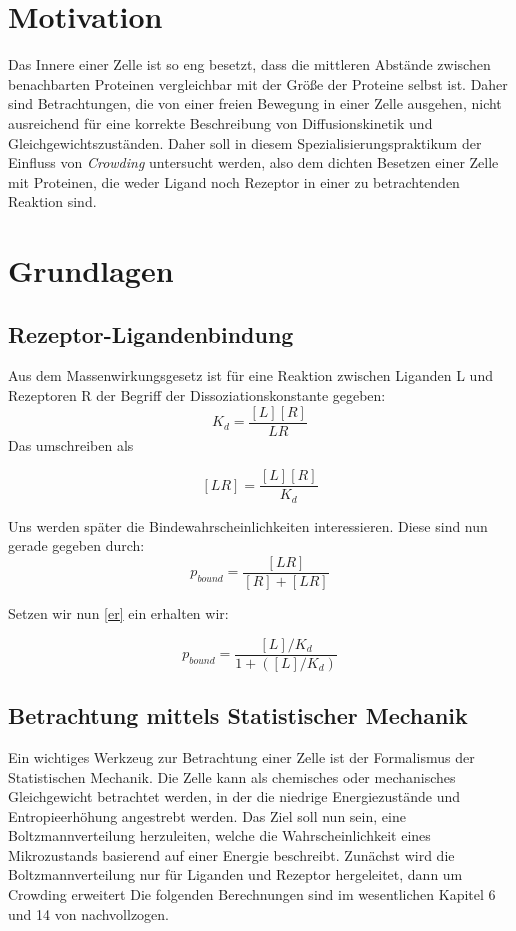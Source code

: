 \documentclass[bachelor,       %
               twoside,        %
               BCOR10mm,       %
               english,ngerman, %
               ]{GAUBM}
\begin{document}
\mainmatter   %

\chapter{Motivation}
Das Innere einer Zelle ist so eng besetzt, dass die mittleren Abstände zwischen
benachbarten Proteinen vergleichbar mit der Größe der Proteine selbst ist.
Daher sind Betrachtungen, die von einer freien Bewegung in einer Zelle ausgehen,
nicht ausreichend für eine korrekte Beschreibung von Diffusionskinetik und Gleichgewichtszuständen.
Daher soll in diesem Spezialisierungspraktikum der Einfluss von \emph{Crowding}
untersucht werden, also dem dichten Besetzen einer Zelle mit Proteinen, die weder
Ligand noch Rezeptor in einer zu betrachtenden Reaktion sind.


\chapter{Grundlagen}
\section{Rezeptor-Ligandenbindung}

Aus dem Massenwirkungsgesetz ist für eine Reaktion zwischen Liganden L und Rezeptoren R der Begriff
der Dissoziationskonstante gegeben:
\begin{equation}
K_d = \frac{[L][R]}{LR}
\end{equation}
Das umschreiben als

\begin{equation}
\label{er}
[LR] = \frac{[L][R]}{K_d}
\end{equation}

Uns werden später die Bindewahrscheinlichkeiten interessieren. Diese sind nun gerade gegeben durch:
\begin{equation}
p_{bound} = \frac{[LR]}{[R]+[LR]}
\end{equation}

Setzen wir nun \ref{er} ein erhalten wir:

\begin{equation}
\label{pbounddiss}
p_{bound} = \frac{[L]/K_d}{1+([L]/K_d)}
\end{equation}



\section{Betrachtung mittels Statistischer Mechanik}
Ein wichtiges Werkzeug zur Betrachtung einer Zelle ist der Formalismus der
Statistischen Mechanik. Die Zelle kann als chemisches oder mechanisches Gleichgewicht
betrachtet werden, in der die niedrige Energiezustände und Entropieerhöhung angestrebt
werden. Das Ziel soll nun sein, eine Boltzmannverteilung herzuleiten, welche die
Wahrscheinlichkeit eines Mikrozustands basierend auf einer Energie beschreibt.
Zunächst wird die Boltzmannverteilung nur für Liganden und Rezeptor hergeleitet,
dann um Crowding erweitert
Die folgenden Berechnungen sind im wesentlichen Kapitel 6 und 14 von
\cite{phybio} nachvollzogen.
\end{document}
